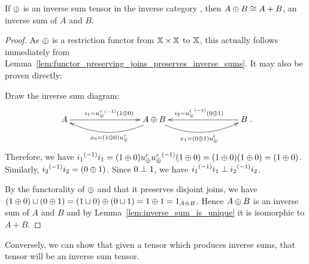 \begin{lemma}\label{lem:an_inverse_sum_tensor_gives_inverse_sums}
  If $\oplus$ is an inverse sum tensor in the inverse category \X, then $A\oplus B \cong A+B$, an inverse
  sum of $A$ and $B$.
\end{lemma}
\begin{proof}
  As $\oplus$ is a restriction functor from $\mathbb{X}\times\mathbb{X}$ to $\mathbb{X}$, this actually follows immediately
  from Lemma~\ref{lem:functor_preserving_joins_preserves_inverse_sums}. It may also be proven
  directly:

  Draw the inverse sum diagram:
  \[
    \xymatrix @C+60pt{
      A\ar[r]^{i_1=\inv{\upr} (1\+0)}
        & A\+B \ar@/^15pt/[l]^{x_0=(1\+0)\upr} \ar@/_15pt/[r]_{x_1=(0\+1)\upl}
          & B \ar[l]_{i_2=\inv{\upl} (0\+1)}
    }.
  \]
  Therefore, we have ${i_1}^{(-1)}i_1 =
  (1\oplus0)u_{\oplus}^r {u_{\oplus}^r}^{(-1)} (1\oplus0) = (1\oplus0)(1\oplus0) = (1\oplus0)$. Similarly, ${i_2}^{(-1)} i_2 = (0\oplus1)$.
  Since $0\perp 1$, we have ${i_1}^{(-1)}i_1 \perp {i_2}^{(-1)} i_2$.

  By the functorality of $\oplus$ and that it preserves disjoint joins, we have $(1\oplus0) \sqcup (0 \oplus1)
  = (1\sqcup 0 ) \oplus (0\sqcup 1) = 1 \oplus 1 = 1_{A\oplus B}$. Hence $A\oplus B$ is an inverse sum of $A$ and
  $B$ and by Lemma~\ref{lem:inverse_sum_is_unique} it is isomorphic to $A+B$.
\end{proof}

Conversely, we can show that given a tensor which produces inverse sums, that tensor will
be an inverse sum tensor.

